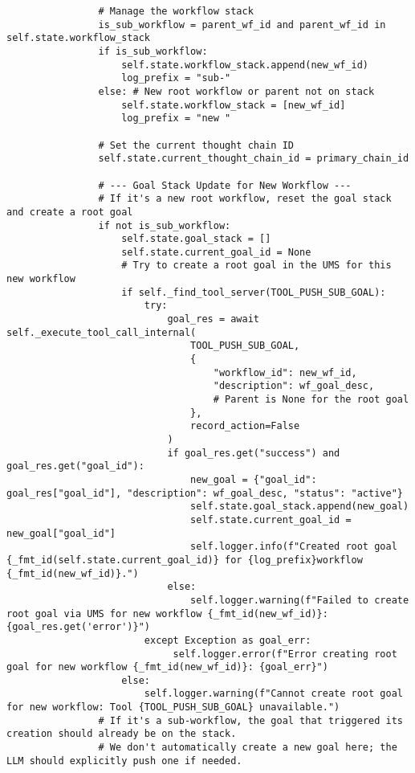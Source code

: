 \documentclass[12pt,a4paper]{article}
\begin{document}
\begin{pageablecode}
\begin{verbatim}
                # Manage the workflow stack
                is_sub_workflow = parent_wf_id and parent_wf_id in self.state.workflow_stack
                if is_sub_workflow:
                    self.state.workflow_stack.append(new_wf_id)
                    log_prefix = "sub-"
                else: # New root workflow or parent not on stack
                    self.state.workflow_stack = [new_wf_id]
                    log_prefix = "new "

                # Set the current thought chain ID
                self.state.current_thought_chain_id = primary_chain_id

                # --- Goal Stack Update for New Workflow ---
                # If it's a new root workflow, reset the goal stack and create a root goal
                if not is_sub_workflow:
                    self.state.goal_stack = []
                    self.state.current_goal_id = None
                    # Try to create a root goal in the UMS for this new workflow
                    if self._find_tool_server(TOOL_PUSH_SUB_GOAL):
                        try:
                            goal_res = await self._execute_tool_call_internal(
                                TOOL_PUSH_SUB_GOAL,
                                {
                                    "workflow_id": new_wf_id,
                                    "description": wf_goal_desc,
                                    # Parent is None for the root goal
                                },
                                record_action=False
                            )
                            if goal_res.get("success") and goal_res.get("goal_id"):
                                new_goal = {"goal_id": goal_res["goal_id"], "description": wf_goal_desc, "status": "active"}
                                self.state.goal_stack.append(new_goal)
                                self.state.current_goal_id = new_goal["goal_id"]
                                self.logger.info(f"Created root goal {_fmt_id(self.state.current_goal_id)} for {log_prefix}workflow {_fmt_id(new_wf_id)}.")
                            else:
                                self.logger.warning(f"Failed to create root goal via UMS for new workflow {_fmt_id(new_wf_id)}: {goal_res.get('error')}")
                        except Exception as goal_err:
                             self.logger.error(f"Error creating root goal for new workflow {_fmt_id(new_wf_id)}: {goal_err}")
                    else:
                        self.logger.warning(f"Cannot create root goal for new workflow: Tool {TOOL_PUSH_SUB_GOAL} unavailable.")
                # If it's a sub-workflow, the goal that triggered its creation should already be on the stack.
                # We don't automatically create a new goal here; the LLM should explicitly push one if needed.


\end{verbatim}
\end{pageablecode}
\end{document}
